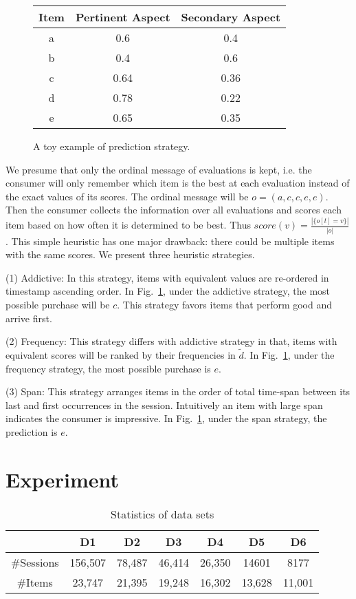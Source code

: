 \documentclass[sigconf]{acmart}
\begin{document}
\begin{figure}[htbp]
\begin{center}
\begin{tabular}{|c|c|c|}
\hline
Item & Pertinent Aspect & Secondary Aspect \\\hline
a & 0.6 & 0.4 \\
b & 0.4 & 0.6  \\
c & 0.64 & 0.36 \\
d & 0.78 & 0.22 \\
e & 0.65 & 0.35 \\\hline
\end{tabular}
\caption{A toy example of prediction strategy. }\label{fig:illustration}
\end{center}
\end{figure}


We presume that only the ordinal message of evaluations is kept, i.e. the consumer will only remember which item is the best at each evaluation instead of the exact values of its scores. The ordinal message will be $o=(a,c,c,e,e)$. Then the consumer collects the information over all evaluations and scores each item based on how often it is determined to be best. Thus $score(v)=\frac{|\{o[t] = v\}|}{|o|}$. This simple heuristic has one major drawback: there could be multiple items with the same scores. We present three heuristic strategies.



(1) Addictive: In this strategy,  items with equivalent values are re-ordered in timestamp ascending order. In Fig.~\ref{fig:illustration},  under the addictive strategy, the most possible purchase will be $c$. This strategy favors items that perform good and arrive first.

(2) Frequency: This strategy differs with addictive strategy in that, items with equivalent scores will be ranked by their frequencies in $\tilde{d}$. In Fig.~\ref{fig:illustration},  under the frequency strategy, the most possible purchase is $e$.

(3) Span: This strategy arranges items in the order of total time-span between its last and first occurrences in the session. Intuitively an item with large span indicates the  consumer is impressive. In Fig.~\ref{fig:illustration}, under the span strategy, the prediction is $e$.


\section{Experiment}\label{sec:experiment}
\begin{table}[htp]
\caption{Statistics of data sets}
\begin{center}
\begin{tabular}{|c|c|c|c|c|c|c|}
\hline
 &D1 &D2 &D3 & D4 & D5 & D6 \\\hline
\#Sessions & 156,507& 78,487 & 46,414&26,350 &14601 &8177\\\hline
\#Items & 23,747& 21,395 &19,248 & 16,302& 13,628&11,001\\\hline
\end{tabular}
\end{center}
\label{tab:data}
\end{table}%
\end{document}
